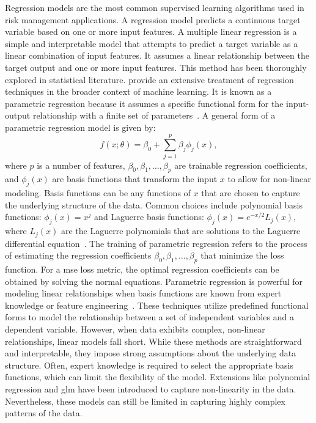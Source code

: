 Regression models are the most common supervised learning algorithms used in risk management applications.
A regression model predicts a continuous target variable based on one or more input features.
A multiple linear regression is a simple and interpretable model that attempts to predict a target variable as a linear combination of input features.
It assumes a linear relationship between the target output and one or more input features.
This method has been thoroughly explored in statistical literature.
\citet{bishop2006pattern} provide an extensive treatment of regression techniques in the broader context of machine learning.
It is known as a parametric regression because it assumes a specific functional form for the input-output relationship with a finite set of parameters~\citep{seber2012linear}.
A general form of a parametric regression model is given by:
\begin{equation} \label{eq:regression}
    f(x; \theta) = \beta_0 + \sum_{j=1}^{p} \beta_j \phi_j(x),
\end{equation}
where $p$ is a number of features, $\beta_0, \beta_1, \ldots, \beta_p$ are trainable regression coefficients, and $\phi_j(x)$ are basis functions that transform the input $x$ to allow for non-linear modeling.
Basis functions can be any functions of $x$ that are chosen to capture the underlying structure of the data.
Common choices include polynomial basis functions: $\phi_j(x) = x^j$ and Laguerre basis functions: $\phi_j(x) = e^{-x/2} L_j(x)$, where $L_j(x)$ are the Laguerre polynomials that are solutions to the Laguerre differential equation~\citep{szeg1939orthogonal}.
The training of parametric regression refers to the process of estimating the regression coefficients $\beta_0, \beta_1, \ldots, \beta_p$ that minimize the loss function.
For a \gls{mse} loss metric, the optimal regression coefficients can be obtained by solving the normal equations.
Parametric regression is powerful for modeling linear relationships when basis functions are known from expert knowledge or feature engineering~\citep{hastie2009elements}.
These techniques utilize predefined functional forms to model the relationship between a set of independent variables and a dependent variable.
However, when data exhibits complex, non-linear relationships, linear models fall short.
While these methods are straightforward and interpretable, they impose strong assumptions about the underlying data structure.
Often, expert knowledge is required to select the appropriate basis functions, which can limit the flexibility of the model.
Extensions like polynomial regression and \gls{glm} have been introduced to capture non-linearity in the data.
Nevertheless, these models can still be limited in capturing highly complex patterns of the data.

